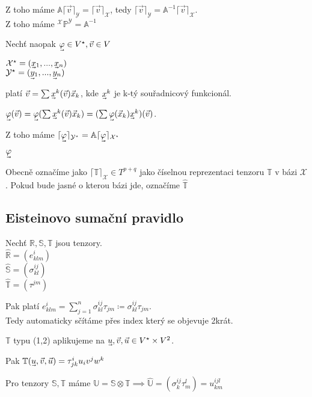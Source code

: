 \documentclass[../main.tex]{subfiles}
\begin{document}
 Z toho máme $\mathbb{A}\lceil\vec{v}\rceil_\mathcal{Y} = \lceil\vec{v}\rceil_\mathcal{X} $, tedy 
 $\lceil\vec{v}\rceil_\mathcal{Y} = \mathbb{A}^{-1} \lceil\vec{v}\rceil_\mathcal{X} $.\\
 Z toho máme $^\mathcal{X}\mathbb{P}^\mathcal{Y} = \mathbb{A}^{-1}$


Nechť naopak $\uvec{\varphi} \in V^\star, \vec{v}\in V$

$\mathcal{X}^\star = (\uvec{x}_1, ... , \uvec{x}_n)$\\
$\mathcal{Y}^\star = (\uvec{y}_1, ... , \uvec{y}_n)$

platí $\vec{v} = \sum \uvec{x}^k (\vec{v}) \vec{x}_k$, kde $\uvec{x}^k$ je k-tý souřadnicový funkcionál.

$\uvec{\varphi} (\vec{v}) = \uvec{\varphi} (\sum \uvec{x}^k (\vec{v}) \vec{x}_k) = (\sum \uvec{\varphi} (\vec{x}_k) \uvec{x}^k) (\vec{v})$.

Z toho máme $\lceil\uvec{\varphi}\rceil_{\mathcal{Y}^\star} = \mathbb{A}\lceil\uvec{\varphi}\rceil_{\mathcal{X}^\star}$

$\uvec{\varphi}$

Obecně označíme jako $\lceil \mathbb{T} \rceil_\mathcal{X} \in T^{p+q}$ jako číselnou reprezentaci tenzoru $\mathbb{T}$ v bázi $\mathcal{X}$.
Pokud bude jasné o kterou bázi jde, označíme $\hat{\mathbb{T}}$

\subsection{Eisteinovo sumační pravidlo}
Nechť $\mathbb{R},\mathbb{S},\mathbb{T}$ jsou tenzory.\\
$\hat{\mathbb{R}} = (e^i_{klm})$\\
$\hat{\mathbb{S}} = (\sigma^{ij}_{kl})$\\
$\hat{\mathbb{T}} = (\tau^{jm})$

Pak platí $e^i_{klm} = \sum_{j=1}^n \sigma^{ij}_{kl} \tau_{jm} \coloneq \sigma_{kl}^{ij} \tau_{jm}$.\\
Tedy automaticky sčítáme přes index který se objevuje 2krát. 

\begin{example}
    $\mathbb{T}$ typu (1,2) aplikujeme na $\uvec{u}, \vec{v}, \vec{u} \in V^\star \times V^2$.

    Pak $\mathbb{T} (\uvec{u}, \vec{v}, \vec{u} ) = \tau^i_{jk} u_i v^j w^k $
\end{example}

\begin{definition}
    Pro tenzory $\mathbb{S}, \mathbb{T}$ máme $\mathbb{U} = \mathbb{S} \otimes \mathbb{T} \implies \hat{\mathbb{U}} = 
    (\sigma_k^{ij} \tau_m^l) = u^{ijl}_{km}$
\end{definition}



\end{document}
